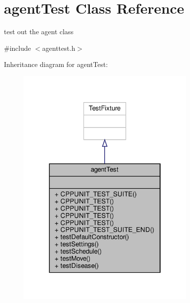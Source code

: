 \hypertarget{classagentTest}{}\section{agent\+Test Class Reference}
\label{classagentTest}


test out the agent class  




{\ttfamily \#include $<$agenttest.\+h$>$}



Inheritance diagram for agent\+Test\+:\nopagebreak
\begin{figure}[H]
\begin{center}
\leavevmode
\includegraphics[width=250pt]{classagentTest__inherit__graph}
\end{center}
\end{figure}


